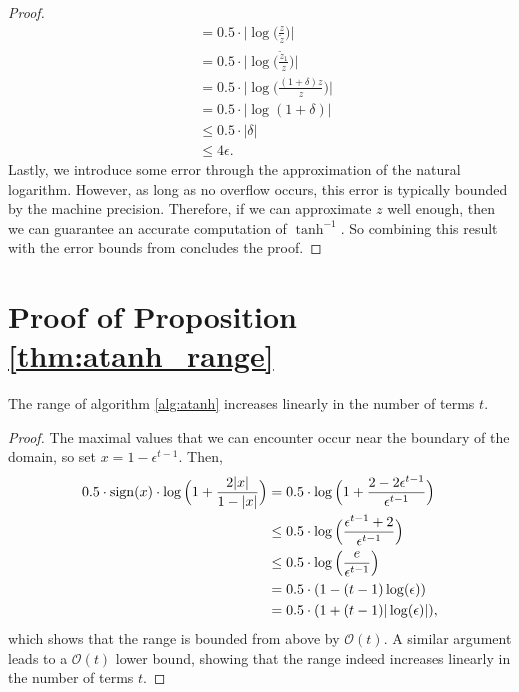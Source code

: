 \begin{proof}
\begin{align}
        &= 0.5 \cdot \Big| \log\Big(\frac{z}{\tilde{z}}\Big) \Big| \\
        &= 0.5 \cdot \Big| \log\Big(\frac{\tilde{z}_1}{z}\Big) \Big| \\
        & = 0.5 \cdot \Big| \log\Big(\frac{(1 + \delta) z}{z}\Big) \Big| \\
        &= 0.5 \cdot |\log(1 + \delta)| \\
        &\leq 0.5 \cdot |\delta| \\
        &\leq 4\epsilon.
    \end{align}
    Lastly, we introduce some error through the approximation of the natural logarithm. However, as long as no overflow occurs, this error is typically bounded by the machine precision. Therefore, if we can approximate $z$ well enough, then we can guarantee an accurate computation of $\tanh^{-1}$. So combining this result with the error bounds from \citep{popescu2017towards} concludes the proof.
\end{proof}

\section{Proof of Proposition \ref{thm:atanh_range}}
\label{sec:atanh_range_proof}
\begin{proposition*}
    The range of algorithm \ref{alg:atanh} increases linearly in the number of terms $t$.
\end{proposition*}

\begin{proof}
    The maximal values that we can encounter occur near the boundary of the domain, so set $x = 1 - \epsilon^{t-1}$. Then,
    \begin{align}
        0.5 \cdot \operatorname{sign}(x) \cdot \log\Big( 1 + \frac{2|x|}{1 - |x|} \Big) &= 0.5 \cdot \log\Big(1 + \frac{2 - 2\epsilon^{t-1}}{\epsilon^{t-1}}\Big) \\
        &\leq 0.5 \cdot \log\Big(\frac{\epsilon^{t-1} + 2}{\epsilon^{t-1}}\Big) \\
        &\leq 0.5 \cdot \log \Big( \frac{e}{\epsilon^{t-1}} \Big) \\
        &= 0.5 \cdot (1 - (t - 1) \log(\epsilon)) \\
        &= 0.5 \cdot (1 + (t - 1) |\log (\epsilon)|),
    \end{align}
    which shows that the range is bounded from above by $\mathcal{O}(t)$. A similar argument leads to a $\mathcal{O}(t)$ lower bound, showing that the range indeed increases linearly in the number of terms $t$.
\end{proof}



